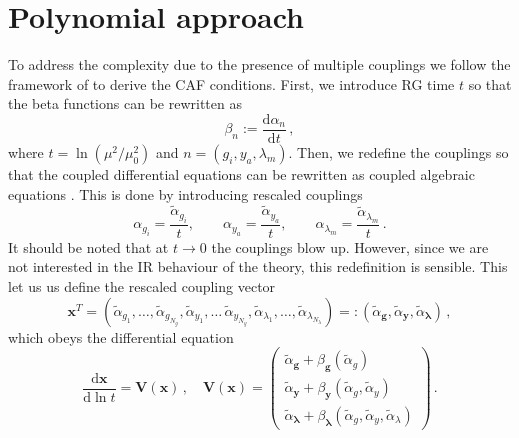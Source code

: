 \vspace{0.8cm}
\section{Polynomial approach}\label{sec:CAF2}
To address the complexity due to the presence of multiple couplings  we follow the framework of \cite{Giudice:2014tma} to derive the CAF conditions. First, we introduce RG time $t$ so that the beta functions can be rewritten as
\begin{equation}
    \beta_n:=\frac{\text{d}\alpha_n}{\text{d}t}\,,
\end{equation}
where $t=\ln(\mu^2/\mu_0^2)$ and $n=({g_i},{y_a},{\lambda_m})$. Then, we redefine the couplings so that the coupled differential equations can be rewritten as coupled algebraic equations \cite{Zimmermann:1984sx}. This is done by introducing rescaled couplings
\begin{equation}
    \alpha_{g_i} = \frac{\tilde \alpha_{g_i}}{t}, \quad \quad  \alpha_{y_a} = \frac{\tilde \alpha_{y_a}}{t}, \quad \quad \alpha_{\lambda_m} = \frac{\tilde \alpha_{\lambda_m}}{t} \,.
\end{equation}
It should be noted that at $t\to0$ the couplings blow up. However, since we are not interested in the IR behaviour of the theory, this redefinition is sensible. 
This let us us define the rescaled coupling vector 
\begin{equation}
    \boldsymbol{x}^T=(\tilde\alpha_{g_1},\dots,\tilde\alpha_{g_{N_g}},\tilde\alpha_{y_1},\dots\,\tilde\alpha_{y_{N_y}},\tilde\alpha_{\lambda_1},\dots,\tilde\alpha_{\lambda_{N_\lambda}})=:(\tilde\alpha_{\boldsymbol{g}},\tilde\alpha_{\boldsymbol{y}},\tilde\alpha_{\boldsymbol{\lambda}})\,,
\end{equation}
which obeys the differential equation
\begin{equation}
    \frac{\text{d}\boldsymbol{x}}{\text{d}\ln t}=\boldsymbol{V}(\boldsymbol{x})\,,\quad
    \boldsymbol{V}(\boldsymbol{x})=\begin{pmatrix}
        \tilde \alpha_{\boldsymbol{g}}+\beta_{\boldsymbol{g}}(\tilde\alpha_{g})\\\tilde \alpha_{\boldsymbol{y}}+\beta_{\boldsymbol{y}}(\tilde\alpha_{g},\tilde\alpha_{y})\\\tilde \alpha_{\boldsymbol{\lambda}}+\beta_{\boldsymbol{\lambda}}(\tilde\alpha_{g},\tilde\alpha_{y},\tilde\alpha_{\lambda})
    \end{pmatrix}\,.\label{eq:CAF2V}
\end{equation}
